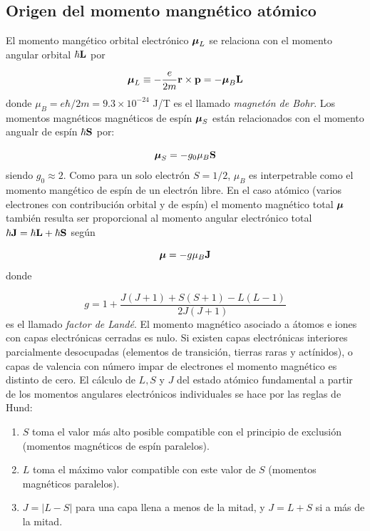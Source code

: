 \subsection{Origen del momento mangnético atómico}

El momento mangético orbital electrónico $\boldsymbol{\mu}_L$ se relaciona con el momento angular orbital $\hbar \mathbf{L}$ por 

\begin{equation}
	\boldsymbol{\mu}_L \equiv - \frac{e}{2m} \mathbf{r} \times \mathbf{p} = - \boldsymbol{\mu}_B \mathbf{L}
\end{equation}
donde $\mu_B=e\hbar / 2m=9.3\times 10^{-24}$ J/T es el llamado \textit{magnetón de Bohr}. Los momentos magnéticos magnéticos de espín $\boldsymbol{\mu}_S$ están relacionados con el momento angualr de espín $\hbar \mathbf{S}$ por:

\begin{equation}
	\boldsymbol{\mu}_S = - g_0 \mu_B \mathbf{S}  \label{Ec:10-03-02}
\end{equation}
siendo $g_0 \approx 2$. Como para un solo electrón $S=1/2$, $\mu_B$ es interpetrable como el momento mangético de espín de un electrón libre. En el caso atómico (varios electrones con contribución orbital y de espín) el momento magnético total $\boldsymbol{\mu}$  también resulta ser proporcional al momento angular electrónico total $\hbar\mathbf{J}=\hbar \mathbf{L} + \hbar \mathbf{S}$ según 

\begin{equation}
	\boldsymbol{\mu} = - g \mu_B \mathbf{J} 
\end{equation}
donde 

\begin{equation}
	g = 1 + \frac{J(J+1)+S(S+1)-L(L-1)}{2J(J+1)}
\end{equation}
es el llamado \textit{factor de Landé}. El momento magnético asociado a átomos e iones con capas electrónicas cerradas es nulo. Si existen capas electrónicas interiores parcialmente desocupadas (elementos de transición, tierras raras y actínidos), o capas de valencia con número impar de electrones el momento magnético es distinto de cero. El cálculo de $L,S$ y $J$ del estado atómico fundamental a partir de los momentos angulares electrónicos individuales se hace por las reglas de Hund:

\begin{enumerate}
	\item $S$ toma el valor más alto posible compatible con el principio de exclusión (momentos magnéticos de espín paralelos).
	\item $L$  toma el máximo valor compatible con este valor de $S$ (momentos magnéticos paralelos).
	\item $J=|L-S|$ para una capa llena a menos de la mitad, y $J=L+S$ si a más de la mitad.
\end{enumerate}


